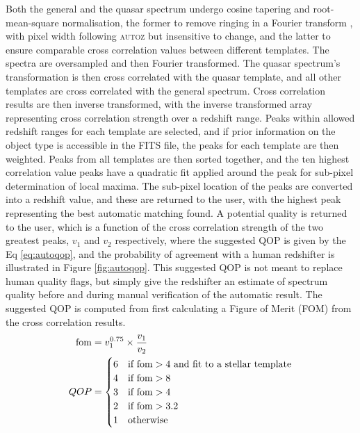 \documentclass[iop]{emulateapj}
\newcommand{\autoz}{\textsc{autoz}}
\begin{document}
Both the general and the quasar spectrum undergo cosine tapering and root-mean-square normalisation, the former to remove ringing in a Fourier transform \citep[apodization;][]{kurtz1998rvsao}, with pixel width following \autoz{} but insensitive to change, and the latter to ensure comparable cross correlation values between different templates. The spectra are oversampled and then Fourier transformed. The quasar spectrum's transformation is then cross correlated with the quasar template, and all other templates are cross correlated with the general spectrum. Cross correlation results are then inverse transformed, with the inverse transformed array representing cross correlation strength over a redshift range. Peaks within allowed redshift ranges for each template are selected, and if prior information on the object type is accessible in the FITS file, the peaks for each template are then weighted. Peaks from all templates are then sorted together, and the ten highest correlation value peaks have a quadratic fit applied around the peak for sub-pixel determination of local maxima. The sub-pixel location of the peaks are converted into a redshift value, and these are returned to the user, with the highest peak representing the best automatic matching found. A potential quality is returned to the user, which is a function of the cross correlation strength of the two greatest peaks, $v_1$ and $v_2$ respectively, where the suggested QOP is given by the Eq \eqref{eq:autoqop}, and the probability of agreement with a human redshifter is illustrated in Figure \ref{fig:autoqop}. This suggested QOP is not meant to replace human quality flags, but simply give the redshifter an estimate of spectrum quality before and during manual verification of the automatic result. The suggested QOP is computed from first calculating a Figure of Merit (FOM) from the cross correlation results.
\begin{align}
{\rm fom} &= v_1^{0.75} \times \frac{v_1}{v_2} \\
QOP &= \begin{cases}6 & \text{if } {\rm fom} > 4 \text{ and fit to a stellar template} \label{eq:autoqop}\\
4 & \text{if } {\rm fom} > 8  \\
3 & \text{if } {\rm fom} > 4 \\
2 & \text{if } {\rm fom} > 3.2 \\
1 & \text{otherwise} \end{cases}
\end{align}
\end{document}
